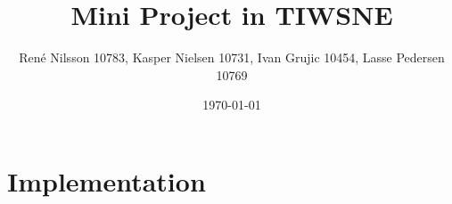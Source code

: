 \documentclass[]{report}
\begin{document}
\title{Mini Project in TIWSNE}
\author{René Nilsson 10783, Kasper Nielsen 10731, Ivan Grujic 10454, Lasse Pedersen 10769}

\date{\today}
\maketitle
{}

\tableofcontents



 

\chapter{Implementation}















\end{document}
